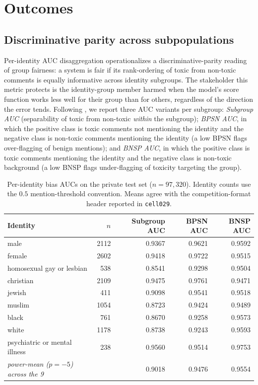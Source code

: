 \documentclass[11pt]{article}
\begin{document}
\section{Outcomes}

\subsection{Discriminative parity across subpopulations}

Per-identity AUC disaggregation operationalizes a discriminative-parity reading of group fairness: a system is fair if its rank-ordering of toxic from non-toxic comments is equally informative across identity subgroups. The stakeholder this metric protects is the identity-group member harmed when the model's score function works less well for their group than for others, regardless of the direction the error tends. Following \citet{borkan2019nuanced}, we report three AUC variants per subgroup: \emph{Subgroup AUC} (separability of toxic from non-toxic \emph{within} the subgroup); \emph{BPSN AUC}, in which the positive class is toxic comments not mentioning the identity and the negative class is non-toxic comments mentioning the identity (a low BPSN flags over-flagging of benign mentions); and \emph{BNSP AUC}, in which the positive class is toxic comments mentioning the identity and the negative class is non-toxic background (a low BNSP flags under-flagging of toxicity targeting the group).

\begin{table}[h]
\centering
\small
\begin{tabular}{lrrrr}
\toprule
Identity & $n$ & Subgroup AUC & BPSN AUC & BNSP AUC \\
\midrule
male                          & 2112 & 0.9367 & 0.9621 & 0.9592 \\
female                        & 2602 & 0.9418 & 0.9722 & 0.9515 \\
homosexual gay or lesbian     &  538 & 0.8541 & 0.9298 & 0.9504 \\
christian                     & 2109 & 0.9475 & 0.9761 & 0.9471 \\
jewish                        &  411 & 0.9098 & 0.9541 & 0.9518 \\
muslim                        & 1054 & 0.8723 & 0.9424 & 0.9489 \\
black                         &  761 & 0.8670 & 0.9258 & 0.9573 \\
white                         & 1178 & 0.8738 & 0.9243 & 0.9593 \\
psychiatric or mental illness &  238 & 0.9560 & 0.9514 & 0.9753 \\
\midrule
\textit{power-mean ($p{=}{-}5$) across the 9}    &      & 0.9018 & 0.9476 & 0.9554 \\
\bottomrule
\end{tabular}
\caption{Per-identity bias AUCs on the private test set ($n = 97{,}320$). Identity counts use the $0.5$ mention-threshold convention. Means agree with the competition-format header reported in \texttt{cell029}.}
\label{tab:bias-aucs}
\end{table}
\end{document}

